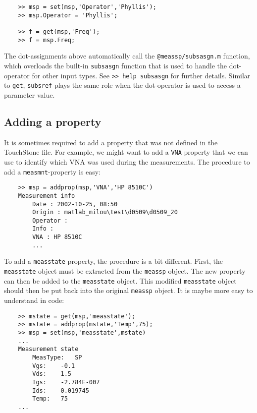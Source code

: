 \begin{small}
\begin{verbatim}
    >> msp = set(msp,'Operator','Phyllis');
    >> msp.Operator = 'Phyllis';

    >> f = get(msp,'Freq');
    >> f = msp.Freq;
\end{verbatim}
\end{small}

The dot-assignments above automatically call the
\verb"@meassp/subsasgn.m" function, which overloads the built-in
\verb"subsasgn" function that is used to handle the dot-operator
for other input types. See \verb">> help subsasgn" for further
details. Similar to \verb"get", \verb"subsref" plays the same role
when the dot-operator is used to access a parameter value.

\subsection{Adding a property}
It is sometimes required to add a property that was not defined in
the TouchStone file. For example, we might want to add a
\verb"VNA" property that we can use to identify which VNA was used
during the measurements. The procedure to add a
\verb"measmnt"-property is easy:

\begin{small}
\begin{verbatim}
    >> msp = addprop(msp,'VNA','HP 8510C')
    Measurement info
        Date : 2002-10-25, 08:50
        Origin : matlab_milou\test\d0509\d0509_20
        Operator :
        Info :
        VNA : HP 8510C
        ...
\end{verbatim}
\end{small}
To add a \verb"measstate" property, the procedure is a bit
different. First, the \verb"measstate" object must be extracted
from the \verb"meassp" object. The new property can then be added
to the \verb"measstate" object. This modified \verb"measstate"
object should then be put back into the original \verb"meassp"
object. It is maybe more easy to understand in code:

\begin{small}
\begin{verbatim}
    >> mstate = get(msp,'measstate');
    >> mstate = addprop(mstate,'Temp',75);
    >> msp = set(msp,'measstate',mstate)
    ...
    Measurement state
        MeasType:   SP
        Vgs:    -0.1
        Vds:    1.5
        Igs:    -2.784E-007
        Ids:    0.019745
        Temp:   75
    ...
\end{verbatim}
\end{small}

